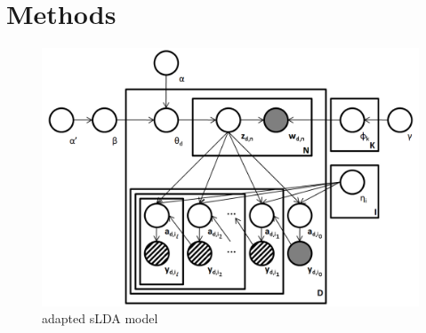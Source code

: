 \documentclass{article}
\begin{document}
\section{Methods}

%
\begin{figure}[h]
 \centering \includegraphics[scale=0.3]{Graphical_Model2} \caption{adapted sLDA model}


\label{fig:example} 
\end{figure}
\end{document}
